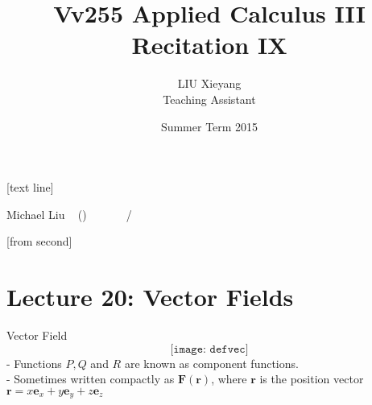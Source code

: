 \documentclass[10pt]{beamer}
\begin{document}



[text line]{%
	\color{blue!40!black}\parbox{\linewidth}{\vspace*{-8pt}Michael Liu ~ (\insertshortinstitute)\hfill\insertshorttitle\hfill\insertshortdate~~~~~~\insertframenumber{}~/~\inserttotalframenumber}}


[from second] 

\newcommand{\tabincell}[2]{\begin{tabular}{@{}#1@{}}#2\end{tabular}}


\title[Vv255 Applied Calculus III]{Vv255 Applied Calculus III\\{\small Recitation IX}}   
\author[Michael Liu]{LIU Xieyang\\{\tiny Teaching Assistant}} 
\date[Summer 2015]{Summer Term 2015} 
\begin{frame}
	\titlepage
\end{frame}






\section{Lecture 20: Vector Fields} 



\begin{frame}[allowframebreaks]{Vector Field}
$$\texttt{[image: defvec]}$$
- Functions $P, Q$ and $R$ are known as {\color{red} component functions}.
\\- Sometimes written compactly as $\mathbf{F}(\mathbf{r})$, 
where $\mathbf{r}$ is the position vector $\mathbf{r} = x\mathbf{e}_x + y\mathbf{e}_y + z\mathbf{e}_z$
\end{frame}
\end{document}
